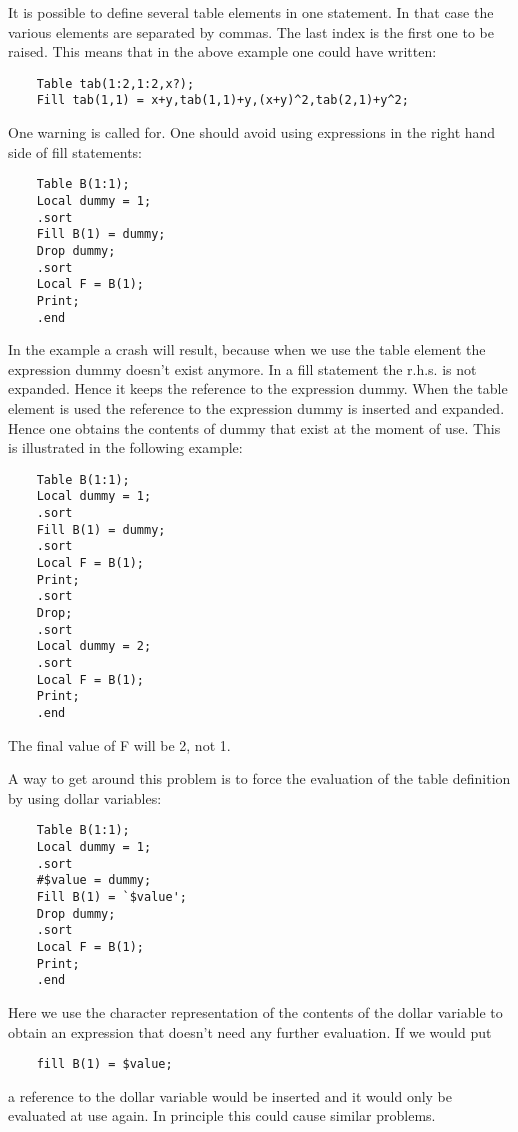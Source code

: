\noindent It is possible to define several table elements in one statement. 
In that case the various elements are separated by commas. The last index 
is the first one to be raised. This means that in the above example one 
could have written:
\begin{verbatim}
    Table tab(1:2,1:2,x?);
    Fill tab(1,1) = x+y,tab(1,1)+y,(x+y)^2,tab(2,1)+y^2;
\end{verbatim}\vspace{10mm}

\noindent One warning is called for. One should avoid using 
expressions in the right hand side of fill statements:
\begin{verbatim}
    Table B(1:1);
    Local dummy = 1;
    .sort
    Fill B(1) = dummy;
    Drop dummy;
    .sort
    Local F = B(1);
    Print;
    .end
\end{verbatim}
In the example a crash will result, because when we use the table element 
the expression dummy doesn't exist anymore. In a fill statement the r.h.s. 
is not expanded. Hence it keeps the reference to the expression dummy. When 
the table element is used the reference to the expression dummy is inserted 
and expanded. Hence one obtains the contents of dummy that exist at the 
moment of use. This is illustrated in the following example:
\begin{verbatim}
    Table B(1:1);
    Local dummy = 1;
    .sort
    Fill B(1) = dummy;
    .sort
    Local F = B(1);
    Print;
    .sort
    Drop;
    .sort
    Local dummy = 2;
    .sort
    Local F = B(1);
    Print;
    .end
\end{verbatim}
The final value of F will be 2, not 1.

\noindent A way to get around this problem is to force the evaluation of 
the table definition by using dollar 
variables:
\begin{verbatim}
    Table B(1:1);
    Local dummy = 1;
    .sort
    #$value = dummy;
    Fill B(1) = `$value';
    Drop dummy;
    .sort
    Local F = B(1);
    Print;
    .end
\end{verbatim}
Here we use the character representation of the contents of the dollar 
variable to obtain an expression that doesn't need any further evaluation. 
If we would put
\begin{verbatim}
    fill B(1) = $value;
\end{verbatim}
a reference to the dollar variable would be inserted and it would only be 
evaluated at use again. In principle this could cause similar problems.

